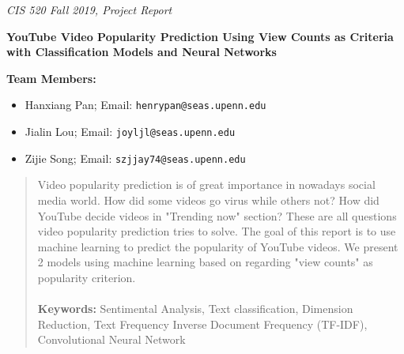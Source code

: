 \documentclass[english]{article}
\begin{document}


\emph{\footnotesize{CIS 520 Fall 2019, Project Report}}

\vspace{12pt}



\textbf{\Large{YouTube Video Popularity Prediction Using View Counts as Criteria with Classification Models and Neural Networks}}

\vspace{1cm}

\textbf{Team Members:}

\begin{itemize}
 \item Hanxiang Pan; Email: \texttt{henrypan@seas.upenn.edu}
 \item Jialin Lou; Email: \texttt{joyljl@seas.upenn.edu}
 \item Zijie Song; Email: \texttt{szjjay74@seas.upenn.edu} 
\end{itemize}

\hline


\begin{abstract}
Video popularity prediction is of great importance in nowadays social media world. How did some videos go virus while others not? How did YouTube decide videos in "Trending now" section? These are all questions video popularity prediction tries to solve. The goal of this report is to use machine learning to predict the popularity of YouTube videos. We present 2 models using machine learning based on regarding "view counts" as popularity criterion. \\\\
\textbf{Keywords:} Sentimental Analysis, Text classification, Dimension Reduction, Text Frequency Inverse Document Frequency (TF-IDF), Convolutional Neural Network
\end{abstract}
\end{document}
